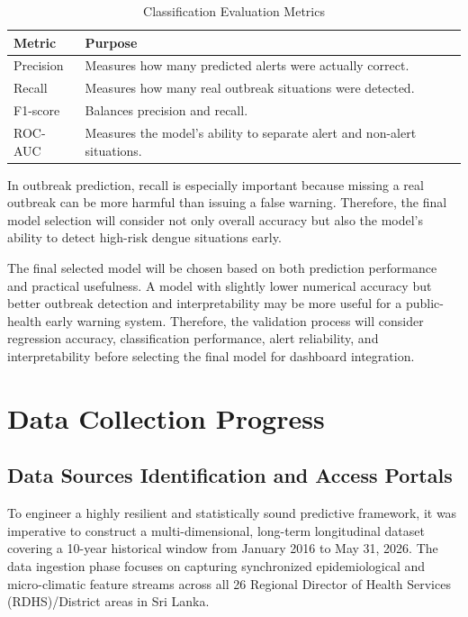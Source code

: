 \documentclass[12pt,a4paper]{article}
\begin{document}
\begin{table}[htbp]
\centering
\caption{Classification Evaluation Metrics}
\label{tab:classification_metrics}
\begin{tabular}{p{3.5cm} p{9cm}}
\toprule
\textbf{Metric} & \textbf{Purpose} \\
\midrule
Precision & Measures how many predicted alerts were actually correct. \\

Recall & Measures how many real outbreak situations were detected. \\

F1-score & Balances precision and recall. \\

ROC-AUC & Measures the model's ability to separate alert and non-alert situations. \\
\bottomrule
\end{tabular}
\end{table}

In outbreak prediction, recall is especially important because missing a real outbreak can be more harmful than issuing a false warning. Therefore, the final model selection will consider not only overall accuracy but also the model's ability to detect high-risk dengue situations early.

The final selected model will be chosen based on both prediction performance and practical usefulness. A model with slightly lower numerical accuracy but better outbreak detection and interpretability may be more useful for a public-health early warning system. Therefore, the validation process will consider regression accuracy, classification performance, alert reliability, and interpretability before selecting the final model for dashboard integration.


\clearpage
\section{Data Collection Progress}
\label{sec:data_collection}

\subsection{Data Sources Identification and Access Portals}
To engineer a highly resilient and statistically sound predictive framework, it was imperative to construct a multi-dimensional, long-term longitudinal dataset covering a 10-year historical window from January 2016 to May 31, 2026. The data ingestion phase focuses on capturing synchronized epidemiological and micro-climatic feature streams across all 26 Regional Director of Health Services (RDHS)/District areas in Sri Lanka.
\end{document}
